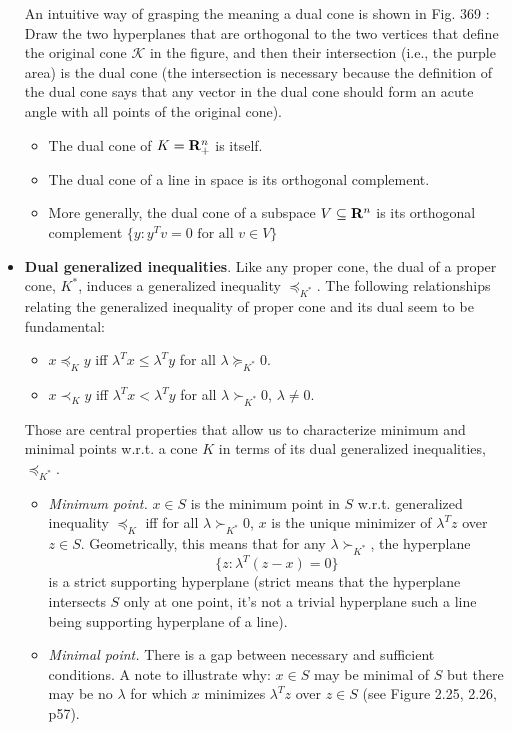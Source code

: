 \documentclass[a4paper, oneside]{book}
\begin{document}
\begin{itemize}
An intuitive way of grasping the meaning a dual cone is shown in Fig. 369 \cite{dattorro10}: Draw the two hyperplanes that are orthogonal to the two vertices that define the original cone $\mathcal K$ in the figure, and then their intersection (i.e., the purple area) is the dual cone (the intersection is necessary because the definition of the dual cone says that any vector in the dual cone should form an acute angle with all points of the original cone). 
	\begin{itemize}
	\item The dual cone of $K=\mathbf R^n_+$ is itself.
	\item The dual cone of a line in space is its orthogonal complement.
	\item More generally, the dual cone of a subspace $V \subseteq \mathbf R^n$ is its orthogonal complement $\{ y : y^Tv  = 0 \text{ for all } v \in V \}$
	\end{itemize}
\item \textbf{Dual generalized inequalities}. Like any proper cone, the dual of a proper cone, $K^*$, induces a generalized inequality $\preceq_{K^*}$. The following relationships relating the generalized inequality of proper cone and its dual seem to be fundamental:
	\begin{itemize}
	\item $x \preceq_K y$ iff $\lambda^Tx \le \lambda^T y$ for all $\lambda \succeq_{K^*}0$.
	\item $x \prec_K y$ iff $\lambda^Tx < \lambda^T y$ for all $\lambda \succ_{K^*}0$, $\lambda \neq 0$.
	\end{itemize}
Those are central properties that allow us to characterize minimum and minimal points w.r.t. a cone $K$ in terms of its dual generalized inequalities, $\preceq_{K^*}$.
	\begin{itemize}
	\item \textit{Minimum point.} $x \in S$ is the minimum point in $S$ w.r.t. generalized inequality $\preceq_K$ iff for all $\lambda \succ_{K^*} 0$, $x$ is the unique minimizer of $\lambda^T z$ over $z \in S$. Geometrically, this means that for any $\lambda \succ_{K^*}$, the hyperplane 
	$$\{z : \lambda^T (z-x) =0\}$$
	is a strict supporting hyperplane (strict means that the hyperplane intersects $S$ only at one point, \eg it's not a trivial hyperplane such a line being supporting hyperplane of a line).
	\item \textit{Minimal point.}  There is a gap between necessary and sufficient conditions.  A note to illustrate why: $x \in S$ may be minimal of $S$ but there may be no $\lambda$ for which $x$ minimizes $\lambda^T z$ over $z \in S$ (see Figure 2.25, 2.26, p57).

	\end{itemize}
\end{itemize}




\printindex
\end{document}
